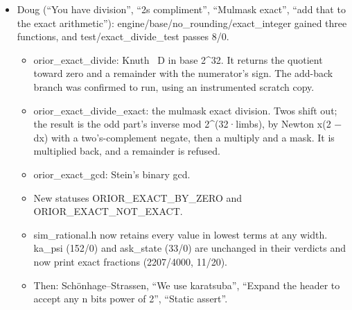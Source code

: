 \begin{enumerate}
\begin{itemize}
\begin{itemize}
\item LEMMA 3.4 IS FALSE AT k = 1. ξ(0.1, 0) − ξ(0, 0.9) = 1/10 − (9/10)α₂ = 0.0090999… < γ\textasciicircum{}−2, and the n = 3 analogue gives 9.0998 units. Lemma 3.8's supports (ramp γ\textasciicircum{}−β(k+1)) overlap at k = 1.
\item The proof's break: (3.11), the α cut at r ≤ k, does hold. It measures exactly 10, 50 and 500050 units for n = 2 at k = 1, 2, 3, and 10 and 5000 units for n = 3 at k = 1, 2. But “the tails cannot annihilate it” does not mean “the tails retain it at or above the bound”.
\item Correct: |µ\_\allowbreak{}k| ≥ γ\textasciicircum{}−nβ(k) − Σ\_\allowbreak{}\{p≥2\}ε\_\allowbreak{}\{k,p\}, about (γ−1)u' with u' = γ\textasciicircum{}−β(k+1). That beats the image width (γ−2)b\_\allowbreak{}k ≈ 8.81u' (n = 2) and 8.88u' (n = 3). With ramp ρ = γ\textasciicircum{}−(β(k+1)+2), the supports are disjoint at every k: checked symbolically for k = 1..57 (n = 2) and k = 1..35 (n = 3). The paper's ramp is covered at no k by this bound.
\item Measured from k = 2 the true gaps are far wider (49.5, 500049.5 and 5000 units). The shifts check: m + 1 = 2n + 1 shifts never share a gap; with m + 1 = γ they do.
\end{itemize}
\item Doug (“You have division”, “2s compliment”, “Mulmask exact”, “add that to the exact arithmetic”): engine/base/no\_\allowbreak{}rounding/exact\_\allowbreak{}integer gained three functions, and test/exact\_\allowbreak{}divide\_\allowbreak{}test passes 8/0.

\begin{itemize}
\item orior\_\allowbreak{}exact\_\allowbreak{}divide: Knuth~\cite{src:Knuth} D in base 2\textasciicircum{}32. It returns the quotient toward zero and a remainder with the numerator's sign. The add-back branch was confirmed to run, using an instrumented scratch copy.
\item orior\_\allowbreak{}exact\_\allowbreak{}divide\_\allowbreak{}exact: the mulmask exact division. Twos shift out; the result is the odd part's inverse mod 2\textasciicircum{}(32·limbs), by Newton x(2 − dx) with a two's-complement negate, then a multiply and a mask. It is multiplied back, and a remainder is refused.
\item orior\_\allowbreak{}exact\_\allowbreak{}gcd: Stein's binary gcd.
\item New statuses ORIOR\_\allowbreak{}EXACT\_\allowbreak{}BY\_\allowbreak{}ZERO and ORIOR\_\allowbreak{}EXACT\_\allowbreak{}NOT\_\allowbreak{}EXACT.
\item sim\_\allowbreak{}rational.h now retains every value in lowest terms at any width. ka\_\allowbreak{}psi (152/0) and ask\_\allowbreak{}state (33/0) are unchanged in their verdicts and now print exact fractions (2207/4000, 11/20).
\item Then: Schönhage–Strassen, “We use karatsuba”, “Expand the header to accept any n bits power of 2”, “Static assert”.


\end{itemize}
\end{itemize}
\end{enumerate}

